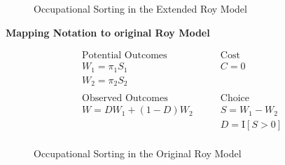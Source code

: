 \begin{frame}
	\begin{figure}[htp]\centering
		\caption{Occupational Sorting in the Extended Roy Model}\label{Occupational Sorting in the Extended Roy Model}
	\end{figure}
\end{frame}
\begin{frame}
	\textbf{Mapping Notation to original Roy Model}
	
	\begin{align*}
	\text{Potential Outcomes} &\qquad \text{Cost} \\
	W_1 = \pi_1 S_1      &\qquad C = 0 \\
	W_2 = \pi_2 S_2       &\qquad \\
	& \\
	\text{Observed Outcomes } &\qquad \text{Choice} \\
	W = D W_1 + (1 - D)W_2 &\qquad S = W_1 - W_2 \\
	&\qquad D = \mathrm{I}[S > 0] \\
	\end{align*}
\end{frame}
\begin{frame}
	\begin{figure}[htp]\centering
		\caption{Occupational Sorting in the Original Roy Model}\label{Occupational Sorting in the Original Roy Model}
	\end{figure}
\end{frame}